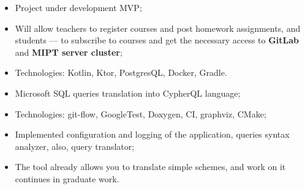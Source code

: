\documentclass[10pt,a4paper,ragged2e,withhyper]{custom-altacv}
\begin{document}
\begin{paracol}{2}
\medskip




\begin{itemize}
	\item Project under development MVP;
	\item Will allow teachers to register courses and post homework assignments, and students --- to subscribe to courses and get the necessary access to \textbf{GitLab} and \textbf{MIPT server cluster};
	\item Technologies: Kotlin, Ktor, PostgresQL, Docker, Gradle.
\end{itemize}

\divider


\begin{itemize}
	\item Microsoft SQL queries translation into CypherQL language;
	\item Technologies: git-flow, GoogleTest, Doxygen, CI, graphviz, CMake;
	\item Implemented configuration and logging of the application, queries syntax analyzer, also, query translator;
	\item The tool already allows you to translate simple schemes, and work on it continues in graduate work.
\end{itemize}

\iffalse
\divider

\cvproject{PDP-11 Emulator \cvtag{C}}{Coursework at MIPT}{April -- July 2021}{pdp11-emulator}{https://github.com/temikfart/pdp11-emulator/}

\begin{itemize}
	\item Coursework was done according to professor's specifications;
	\item Developed an extensive functionality: a lot of commands, processor state word, etc.
\end{itemize}
\fi


\iffalse
{}



\end{paracol}
\end{document}
